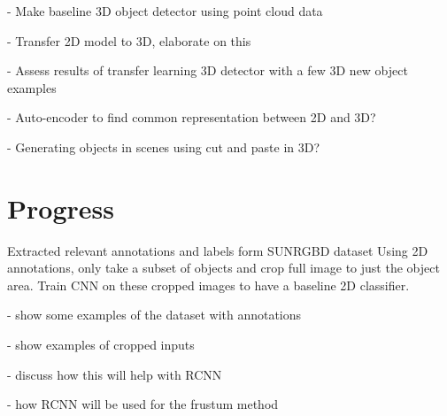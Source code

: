 \documentclass[11pt]{article}
\begin{document}
- Make baseline 3D object detector using point cloud data

- Transfer 2D model to 3D, elaborate on this

- Assess results of transfer learning 3D detector with a few 3D new object examples

- Auto-encoder to find common representation between 2D and 3D?

- Generating objects in scenes using cut and paste in 3D?

\section{Progress}

Extracted relevant annotations and labels form SUNRGBD dataset
Using 2D annotations, only take a subset of objects and crop full image to just the object area.
Train CNN on these cropped images to have a baseline 2D classifier.

- show some examples of the dataset with annotations

- show examples of cropped inputs

- discuss how this will help with RCNN

- how RCNN will be used for the frustum method

\newpage



\end{document}

